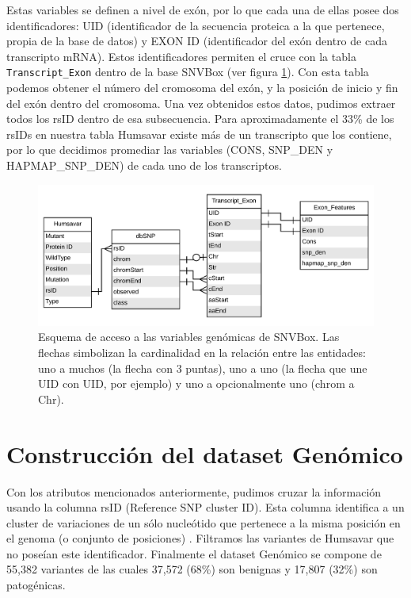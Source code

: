 Estas variables se definen a nivel de exón, por lo que cada una de ellas posee dos identificadores: UID (identificador de la secuencia proteica a la que pertenece, propia de la base de datos) y EXON ID (identificador del exón dentro de cada transcripto mRNA). Estos identificadores permiten el cruce con la tabla \texttt{Transcript\_Exon} dentro de la base SNVBox (ver figura \ref{fig:exon_diagram}). Con esta tabla podemos obtener el número del cromosoma del exón, y la posición de inicio y fin del exón dentro del cromosoma. Una vez obtenidos estos datos, pudimos extraer todos los rsID dentro de esa subsecuencia. Para aproximadamente el 33\% de los rsIDs en nuestra tabla Humsavar existe más de un transcripto que los contiene, por lo que decidimos promediar las variables (CONS, SNP\_DEN y HAPMAP\_SNP\_DEN) de cada uno de los transcriptos.

\begin{figure}[H]
\centering
    \includegraphics[scale=0.40]{documents/latex/figures/3/genomic/exon_diagram.pdf}
    \caption{Esquema de acceso a las variables genómicas de SNVBox. Las flechas simbolizan la cardinalidad en la relación entre las entidades: uno a muchos (la flecha con 3 puntas), uno a uno (la flecha que une UID con UID, por ejemplo) y uno a opcionalmente uno (chrom a Chr).}
    \label{fig:exon_diagram}
\end{figure}

\section{Construcción del dataset Genómico}

Con los atributos mencionados anteriormente, pudimos cruzar la información usando la columna rsID (Reference SNP cluster ID). Esta columna identifica a un cluster de variaciones de un sólo nucleótido que pertenece a la misma posición en el genoma (o conjunto de posiciones) \cite{Ostell2007}. Filtramos las variantes de Humsavar que no poseían este identificador. Finalmente el dataset Genómico se compone de 55,382 variantes de las cuales 37,572 (68\%) son benignas y 17,807 (32\%) son patogénicas. 

